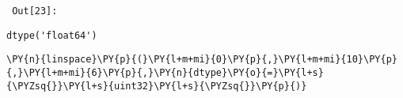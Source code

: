         {\par%
        \vspace{-1\smallerfontscale}%
        \noindent%
        \begin{minipage}{\cellleftmargin}%
    \hfill%
    {\smaller%
    \tt%
    \color{nbframe-out-prompt}%
    Out[23]:}%
    \hspace{\inputpadding}%
    \hspace{0em}%
    \hspace{3pt}%
    \end{minipage}%
        }%
    \begin{addmargin}[\cellleftmargin]{0em}%
    {\smaller%
    \vspace{-1\smallerfontscale}%
    
    
    
    \begin{verbatim}
dtype('float64')
    \end{verbatim}

    
}%
    \end{addmargin}%

{\par%
\vspace{-1\baselineskip}%
}%
\begin{notebookcell}[24]%
\begin{addmargin}[\cellleftmargin]{0em}%
{\smaller%
\par%
%
\vspace{-1\smallerfontscale}%
\begin{Verbatim}[commandchars=\\\{\}]
\PY{n}{linspace}\PY{p}{(}\PY{l+m+mi}{0}\PY{p}{,}\PY{l+m+mi}{10}\PY{p}{,}\PY{l+m+mi}{6}\PY{p}{,}\PY{n}{dtype}\PY{o}{=}\PY{l+s}{\PYZsq{}}\PY{l+s}{uint32}\PY{l+s}{\PYZsq{}}\PY{p}{)}
\end{Verbatim}
%
\par%
\vspace{-1\smallerfontscale}}%
\end{addmargin}
\end{notebookcell}

\par\vspace{1\smallerfontscale}%
    
